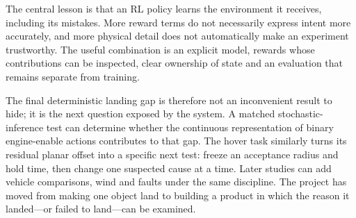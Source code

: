 The central lesson is that an RL policy learns the environment it receives, including its
mistakes. More reward terms do not necessarily express intent more accurately, and more physical
detail does not automatically make an experiment trustworthy. The useful combination is an
explicit model, rewards whose contributions can be inspected, clear ownership of state and an
evaluation that remains separate from training.

The final deterministic landing gap is therefore not an inconvenient result to hide; it is the
next question exposed by the system. A matched stochastic-inference test can determine whether
the continuous representation of binary engine-enable actions contributes to that gap. The
hover task similarly turns its residual planar offset into a specific next test: freeze an
acceptance radius and hold time, then change one suspected cause at a time. Later studies can add
vehicle comparisons, wind and faults under the same discipline. The project has moved from
making one object land to building a product in which the reason it landed---or failed to
land---can be examined.
